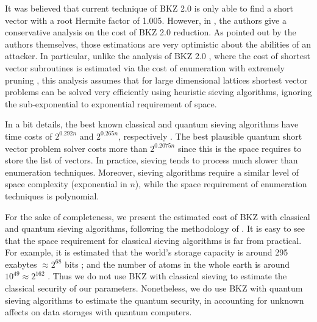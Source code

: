 \documentclass{llncs}
\newcommand{\<}{\langle}
\renewcommand{\>}{\rangle}
\begin{document}
It was believed that current
technique of BKZ 2.0 \cite{BKZ2} is only able to find a short vector
with a root Hermite factor of 1.005. %
However, in \cite{newhope}, the authors give a conservative analysis on the cost of BKZ 2.0 reduction. As pointed out by the
authors themselves, those estimations are very optimistic about the abilities of an attacker. In particular, unlike
the analysis of BKZ 2.0 \cite{BKZ2}, where the cost of shortest vector subroutines is estimated via the cost of
enumeration with extremely pruning \cite{GNR10}, this analysis assumes that for large dimensional lattices shortest vector problems can be
solved very efficiently using heuristic sieving algorithms, ignoring the
sub-exponential to exponential requirement of space. %

In a bit details, the best known classical and quantum sieving algorithms have time costs of $2^{0.292n}$ and $2^{0.265n}$, respectively \cite{DBLP:journals/iacr/BaiLS16}. The best plausible quantum short vector problem solver costs more than $2^{0.2075n}$ since this is 
the space requires to store the list of vectors.
In practice, sieving tends to process much slower than enumeration techniques. Moreover, sieving algorithms require a similar level of space complexity
(exponential in $n$), while the space requirement of enumeration techniques is polynomial. 

For the sake of completeness, we present the estimated cost
of BKZ with classical and quantum sieving algorithms, 
following the methodology of \cite{newhope}. It is easy
to see that the space requirement for classical sieving
algorithms is far from practical. For example, it is estimated
that the world's storage capacity is around 295 exabytes 
$\approx 2^{68}$ bits \cite{storage1}; and the number of
atoms in the whole earth is around $10^{49}\approx 2^{162}$ \cite{atom}. Thus we do not use BKZ with classical sieving
to estimate the classical security of our parameters.
Nonetheless, we do use BKZ with quantum sieving algorithms
to estimate the quantum security, in accounting for 
unknown affects on data storages with quantum computers.
\end{document}
